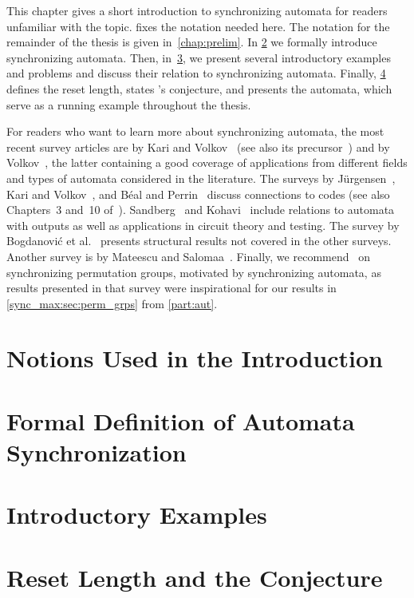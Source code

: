 
This chapter gives a short introduction to synchronizing automata for readers unfamiliar with the topic.  fixes the notation needed here. The notation for the
remainder of the thesis is given in~\cref{chap:prelim}.
In \cref{intro:sec:defsyncaut} 
we formally introduce synchronizing automata. Then, in~\cref{intro:sec:examples}, we present several introductory examples and 
problems and discuss their relation to synchronizing automata.
Finally,
\cref{intro:sec:cerny} defines the reset length, states \Cerny's conjecture,
and presents the \Cerny automata, which serve as a running example throughout
the thesis.

For readers who want to learn more about synchronizing automata, the most recent survey articles are by Kari and Volkov~\cite{KariVolkov2021} (see also its precursor~\cite{DBLP:conf/lata/Volkov08}) and by Volkov~\cite{Volkov22}, 
the latter containing a good coverage
of applications from different fields and types of automata considered in the literature.
 The surveys by Jürgensen~\cite{DBLP:journals/iandc/Jurgensen08}, Kari and Volkov~\cite{KariVolkov2021}, and Béal and Perrin~\cite{BealPerrin2016} discuss connections to codes (see also Chapters~3 and~10 of~\cite{DBLP:books/daglib/0025093}). Sandberg~\cite{Sandberg04} and Kohavi~\cite[Chap.~13]{Kohavi70} include relations to automata with outputs as well as applications in circuit theory and testing. The survey by Bogdanović et al.~\cite{Bogdanovic99} presents structural results not covered in the other surveys. Another survey is by Mateescu and Salomaa~\cite{MateescuS01}. Finally, we recommend~\cite{ArCamSt2017} on synchronizing permutation groups, motivated by synchronizing automata, as results presented in that survey were inspirational for our results in \cref{sync_max:sec:perm_grps} from \cref{part:aut}.

\section{Notions Used in the Introduction}
\label{intro:sec:basic}

	

\section{Formal Definition of Automata Synchronization}
\label{intro:sec:defsyncaut}

	

\section{Introductory Examples}
\label{intro:sec:examples}

	

\section{Reset Length and the \Cerny Conjecture} 
\label{intro:sec:cerny}

